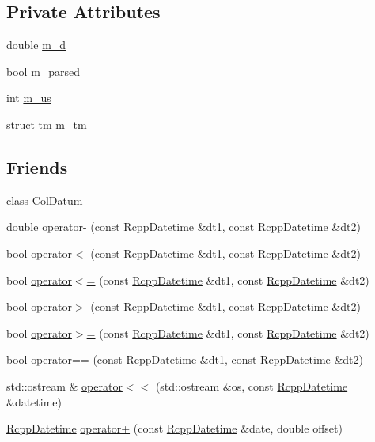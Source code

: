 \subsection*{Private Attributes}
\begin{DoxyCompactItemize}
\item 
double \hyperlink{classRcppDatetime_a1af187ff381bfa0f5b57d28b64d7b60c}{m\_\-d}
\item 
bool \hyperlink{classRcppDatetime_a515e3390c1834e58ce6bba39854638ad}{m\_\-parsed}
\item 
int \hyperlink{classRcppDatetime_a68b9c7b759ffbba14aca3ae0680ea8a4}{m\_\-us}
\item 
struct tm \hyperlink{classRcppDatetime_a3f65c708657270208656c1be885e9f1b}{m\_\-tm}
\end{DoxyCompactItemize}
\subsection*{Friends}
\begin{DoxyCompactItemize}
\item 
class \hyperlink{classRcppDatetime_a2740dcf7de2c2f5471d8fa18944a98d7}{ColDatum}
\item 
double \hyperlink{classRcppDatetime_a946df17f9ce3c423518d0db74e2bbbc4}{operator-\/} (const \hyperlink{classRcppDatetime}{RcppDatetime} \&dt1, const \hyperlink{classRcppDatetime}{RcppDatetime} \&dt2)
\item 
bool \hyperlink{classRcppDatetime_a142f9346629bf7a6f673ba05d9338cf3}{operator$<$} (const \hyperlink{classRcppDatetime}{RcppDatetime} \&dt1, const \hyperlink{classRcppDatetime}{RcppDatetime} \&dt2)
\item 
bool \hyperlink{classRcppDatetime_a7d98733f95f5647ac10bb8236c1a7a8d}{operator$<$=} (const \hyperlink{classRcppDatetime}{RcppDatetime} \&dt1, const \hyperlink{classRcppDatetime}{RcppDatetime} \&dt2)
\item 
bool \hyperlink{classRcppDatetime_a062107b2e2809a60c67f80da5dab77ed}{operator$>$} (const \hyperlink{classRcppDatetime}{RcppDatetime} \&dt1, const \hyperlink{classRcppDatetime}{RcppDatetime} \&dt2)
\item 
bool \hyperlink{classRcppDatetime_a1aac48969216af0555677a43b3617781}{operator$>$=} (const \hyperlink{classRcppDatetime}{RcppDatetime} \&dt1, const \hyperlink{classRcppDatetime}{RcppDatetime} \&dt2)
\item 
bool \hyperlink{classRcppDatetime_ac6643666732e0a62c501da9f0ae9e342}{operator==} (const \hyperlink{classRcppDatetime}{RcppDatetime} \&dt1, const \hyperlink{classRcppDatetime}{RcppDatetime} \&dt2)
\item 
std::ostream \& \hyperlink{classRcppDatetime_a778b21a52b7f2b17978933c3ec27754e}{operator$<$$<$} (std::ostream \&os, const \hyperlink{classRcppDatetime}{RcppDatetime} \&datetime)
\item 
\hyperlink{classRcppDatetime}{RcppDatetime} \hyperlink{classRcppDatetime_a29513e04f8cb90b2a7efea97f8cbd37a}{operator+} (const \hyperlink{classRcppDatetime}{RcppDatetime} \&date, double offset)
\end{DoxyCompactItemize}


